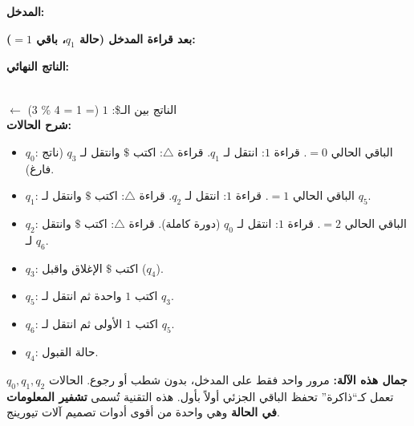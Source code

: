 \documentclass[14pt]{extarticle}
\begin{document}
{\small
\textbf{المدخل:}
\hfill
{}

\textbf{بعد قراءة المدخل (حالة $q_1$، باقي $= 1$):}
\hfill
{}

\textbf{الناتج النهائي:}
\hfill
{}
} \\

$\leftarrow$ الناتج بين الـ\$: $1$ (= 1 = 4 \% 3) \checkmark \\

\medskip
\textbf{شرح الحالات:}
\begin{itemize}
    \item $q_0$: الباقي الحالي $= 0$. قراءة $1$: انتقل لـ $q_1$. قراءة $\triangle$: اكتب $\$$ وانتقل لـ $q_3$ (ناتج فارغ).
    \item $q_1$: الباقي الحالي $= 1$. قراءة $1$: انتقل لـ $q_2$. قراءة $\triangle$: اكتب $\$$ وانتقل لـ $q_5$.
    \item $q_2$: الباقي الحالي $= 2$. قراءة $1$: انتقل لـ $q_0$ (دورة كاملة). قراءة $\triangle$: اكتب $\$$ وانتقل لـ $q_6$.
    \item $q_3$: اكتب $\$$ الإغلاق واقبل ($q_4$).
    \item $q_5$: اكتب $1$ واحدة ثم انتقل لـ $q_3$.
    \item $q_6$: اكتب $1$ الأولى ثم انتقل لـ $q_5$.
    \item $q_4$: حالة القبول.
\end{itemize}

\begin{boxNote}
\textbf{جمال هذه الآلة:} مرور واحد فقط على المدخل، بدون شطب أو رجوع. الحالات $q_0, q_1, q_2$ تعمل كـ``ذاكرة'' تحفظ الباقي الجزئي أولاً بأول. هذه التقنية تُسمى \textbf{تشفير المعلومات في الحالة} وهي واحدة من أقوى أدوات تصميم آلات تيورينج.
\end{boxNote}
\end{document}
